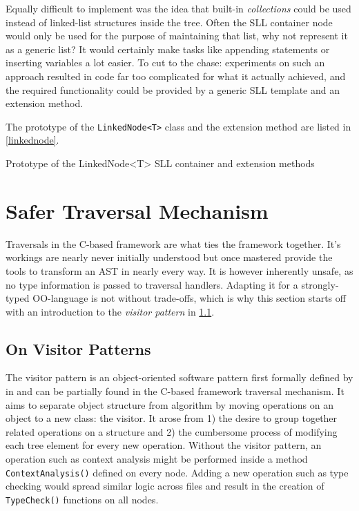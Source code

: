 \documentclass[twoside,openright]{uva-bachelor-thesis}
\newcommand{\code}[1]{\texttt{\footnotesize#1}}
\begin{document}
		Equally difficult to implement was the idea that built-in \emph{collections} could be used instead of linked-list structures inside the tree. Often the SLL container node would only be used for the purpose of maintaining that list, why not represent it as a generic list? It would certainly make tasks like appending statements or inserting variables a lot easier. To cut to the chase: experiments on such an approach resulted in code far too complicated for what it actually achieved, and the required functionality could be provided by a generic SLL template and an extension method.
		
		The prototype of the \code{LinkedNode<T>} class and the extension method are listed in \cref{linkednode}. 
		
		\begin{codebox}[label=linkednode]{Prototype of the LinkedNode<T> SLL container and extension methods}
		\end{codebox}
									
					
	\section{Safer Traversal Mechanism}
	\label{trav}
		Traversals in the C-based framework are what ties the framework together. It's workings are nearly never initially understood but once mastered provide the tools to transform an AST in nearly every way. It is however inherently unsafe, as no type information is passed to traversal handlers. Adapting it for a strongly-typed OO-language is not without trade-offs, which is why this section starts off with an introduction to the \emph{visitor pattern} in \cref{visitor-pattern}. 
		
		\subsection{On Visitor Patterns}
		\label{visitor-pattern}
			The visitor pattern is an object-oriented software pattern first formally defined by \citeauthor{gof1994} in \citeyear{gof1994} and can be partially found in the C-based framework traversal mechanism. It aims to separate object structure from algorithm by moving operations on an object to a new class: the visitor. It arose from 1) the desire to group together related operations on a structure and 2) the cumbersome process of modifying each tree element for every new operation. Without the visitor pattern, an operation such as context analysis might be performed inside a method \code{ContextAnalysis()} defined on every node. Adding a new operation such as type checking would spread similar logic across files and result in the creation of \code{TypeCheck()} functions on all nodes\cite{gof1994}.
			
\end{document}
